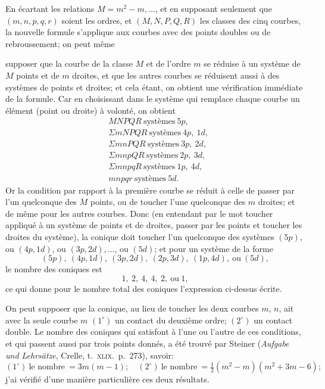 \documentclass[11pt,a4paper]{article}
\begin{document}
\medskip

En \'{e}cartant les relations $M=m^2-m,\ldots$, et en supposant seulement que $(m,n,p,q,r)$ soient les ordres, et $(M,N,P,Q,R)$ les classes des cinq courbes, la nouvelle formule s'applique aux courbes avec des points doubles ou de rebroussement; on peut m\^{e}me
\clearpage

\noindent supposer que la courbe de la classe $M$ et de l'ordre $m$ se r\'{e}duise \`{a} un syst\`{e}me de $M$ points et de $m$ droites, et que les autres courbes se r\'{e}duisent aussi \`{a} des syst\`{e}mes de points et droites; et cela \'{e}tant, on obtient une v\'{e}rification imm\'{e}diate de la formule. Car en choisissant dans le syst\`{e}me qui remplace chaque courbe un \'{e}l\'{e}ment (point ou droite) \`{a} volont\'{e}, on obtient
\begin{align*}
&MNPQR\ \text{syst\`{e}mes}\ 5p, \\
&\Sigma mNPQR\ \text{syst\`{e}mes}\ 4p,\ 1d, \\
&\Sigma mnPQR\ \text{syst\`{e}mes}\ 3p,\ 2d, \\
&\Sigma mnpQR\ \text{syst\`{e}mes}\ 2p,\ 3d, \\
&\Sigma mnpqR\ \text{syst\`{e}mes}\ 1p,\ 4d, \\
&mnpqr\ \text{syst\`{e}mes}\ 5d.
\end{align*}
Or la condition par rapport \`{a} la premi\`{e}re courbe se r\'{e}duit \`{a} celle de passer par l'un quelconque des $M$ points, ou de toucher l'une quelconque des $m$ droites; et de m\^{e}me pour les autres courbes. Donc (en entendant par le mot toucher appliqu\'{e} \`{a} un syst\`{e}me de points et de droites, passer par les points et toucher les droites du syst\`{e}me), la conique doit toucher l'un quelconque des syst\`{e}mes $(5p)$, ou $(4p,1d)$, ou $(3p,2d),\ldots$, ou $(5d)$; et pour un syst\`{e}me de la forme
\[
(5p),\ (4p,1d),\ (3p,2d),\ (2p,3d),\ (1p,4d),\ \text{ou}\ (5d),
\]
le nombre des coniques est
\[
1,\ 2,\ 4,\ 4,\ 2,\ \text{ou}\ 1,
\]
ce qui donne pour le nombre total des coniques l'expression ci-dessus \'{e}crite.

\medskip

On peut supposer que la conique, au lieu de toucher les deux courbes $m$, $n$, ait avec la seule courbe $m$ $(1^\circ)$ un contact du deuxi\`{e}me ordre; $(2^\circ)$ un contact double. Le nombre des coniques qui satisfont \`{a} l'une ou l'autre de ces conditions, et qui passent aussi par trois points donn\'{e}s, a \'{e}t\'{e} trouv\'{e} par Steiner (\textit{Aufgabe und Lehrs\"{a}tze}, Crelle, t.\ \textsc{xlix}.\ p.\ 273), savoir:
\[
(1^\circ)\ \text{le nombre}\ =3m(m-1);\quad (2^\circ)\ \text{le nombre}\ =\tfrac{1}{2}(m^2-m)(m^2+3m-6);
\]
j'ai v\'{e}rifi\'{e} d'une mani\`{e}re particuli\`{e}re ces deux r\'{e}sultats.
\end{document}
